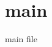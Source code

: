 \documentclass[
    class=article,
    multi={minipage},
    border={3mm},
]{standalone}
\begin{document}
\section{main}
main file
\end{document}
